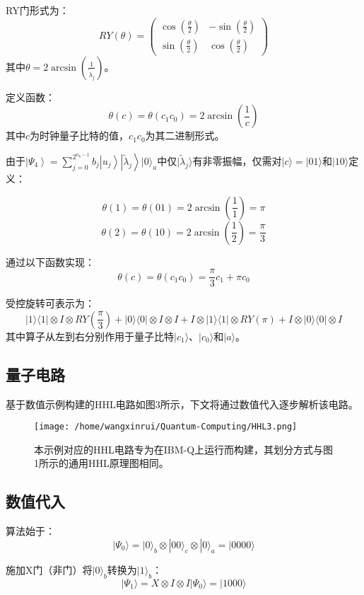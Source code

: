 \documentclass{article}
\begin{document}
RY门形式为：
\[
RY(\theta) = \begin{pmatrix} \cos\left(\frac{\theta}{2}\right) & -\sin\left(\frac{\theta}{2}\right) \\ \sin\left(\frac{\theta}{2}\right) & \cos\left(\frac{\theta}{2}\right) \end{pmatrix}
\]
其中\(\theta = 2\arcsin\left(\frac{1}{\tilde{\lambda}_j}\right)\)。

定义函数：
\[
\theta(c) = \theta(c_1 c_0) = 2\arcsin\left(\frac{1}{c}\right)
\]
其中\(c\)为时钟量子比特的值，\(c_1 c_0\)为其二进制形式。

由于\(
\left|\Psi_{4}\right>=\sum_{j=0}^{2^{n_{b}-1}} b_{j}\left|u_{j}\right\rangle\left|\tilde{\lambda}_{j}\right\rangle|0\rangle_{a}
\)中仅\(|\tilde{\lambda}_j\rangle\)有非零振幅，仅需对\(|c\rangle = |01\rangle\)和\(|10\rangle\)定义：

\[
\theta(1) = \theta(01) = 2\arcsin\left(\frac{1}{1}\right) = \pi 
\]
\[
\theta(2) = \theta(10) = 2\arcsin\left(\frac{1}{2}\right) = \frac{\pi}{3}
\]

通过以下函数实现：
\[
\theta(c) = \theta(c_1 c_0) = \frac{\pi}{3}c_1 + \pi c_0 
\]

受控旋转可表示为：
\[
|1\rangle\langle1| \otimes I \otimes RY\left(\frac{\pi}{3}\right) + |0\rangle\langle0| \otimes I \otimes I + I \otimes |1\rangle\langle1| \otimes RY(\pi) + I \otimes |0\rangle\langle0| \otimes I
\]
其中算子从左到右分别作用于量子比特\(|c_1\rangle\)、\(|c_0\rangle\)和\(|a\rangle\)。

\subsection{量子电路}

基于数值示例构建的HHL电路如图3所示，下文将通过数值代入逐步解析该电路。
\begin{figure}[htbp]
    \centering
    \texttt{[image: /home/wangxinrui/Quantum-Computing/HHL3.png]}
    \caption{本示例对应的HHL电路专为在IBM-Q上运行而构建，其划分方式与图1所示的通用HHL原理图相同。}
\end{figure}

\subsection{数值代入}

算法始于：
\[
|\Psi_0\rangle = |0\rangle_b \otimes |00\rangle_c \otimes |0\rangle_a = |0000\rangle
\]

施加X门（非门）将\(|0\rangle_b\)转换为\(|1\rangle_b\)：
\[
|\Psi_1\rangle = X \otimes I \otimes I |\Psi_0\rangle = |1000\rangle
\]
\end{document}
